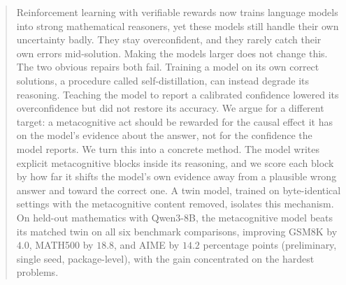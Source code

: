 \begin{abstract}
Reinforcement learning with verifiable rewards now trains language models into
strong mathematical reasoners, yet these models still handle their own
uncertainty badly. They stay overconfident, and they rarely catch their own
errors mid-solution. Making the models larger does not change this. The two
obvious repairs both fail. Training a model on its own correct solutions, a
procedure called self-distillation, can instead degrade its reasoning. Teaching
the model to report a calibrated confidence lowered its overconfidence but did
not restore its accuracy. We argue for a different target: a metacognitive act
should be rewarded for the causal effect it has on the model's evidence about
the answer, not for the confidence the model reports. We turn this into a
concrete method. The model writes explicit metacognitive blocks inside its
reasoning, and we score each block by how far it shifts the model's own evidence
away from a plausible wrong answer and toward the correct one. A twin model,
trained on byte-identical settings with the metacognitive content removed,
isolates this mechanism. On held-out mathematics with Qwen3-8B, the
metacognitive model beats its matched twin on all six benchmark comparisons,
improving GSM8K by $4.0$, MATH500 by $18.8$, and AIME by $14.2$ percentage
points (preliminary, single seed, package-level), with the gain concentrated on
the hardest problems.
\end{abstract}

